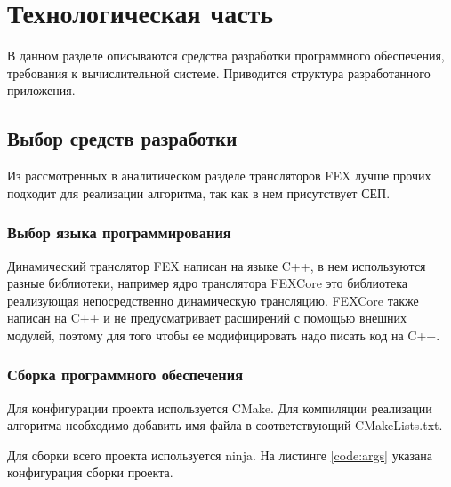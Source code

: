 \section{Технологическая часть}

В данном разделе описываются средства разработки программного обеспечения, требования к вычислительной системе. Приводится структура разработанного приложения.

\subsection{Выбор средств разработки}

Из рассмотренных в аналитическом разделе трансляторов FEX лучше прочих подходит для реализации алгоритма, так как в нем присутствует СЕП.

\subsubsection{Выбор языка программирования}

Динамический транслятор FEX написан на языке C++, в нем используются разные библиотеки, например ядро транслятора FEXCore это библиотека реализующая непосредственно динамическую трансляцию. FEXCore также написан на C++ и не предусматривает расширений с помощью внешних модулей, поэтому для того чтобы ее модифицировать надо писать код на C++.

\subsubsection{Сборка программного обеспечения}

Для конфигурации проекта используется CMake. Для компиляции реализации алгоритма необходимо добавить имя файла в соответствующий CMakeLists.txt.

Для сборки всего проекта используется ninja. На листинге \ref{code:args} указана конфигурация сборки проекта.


